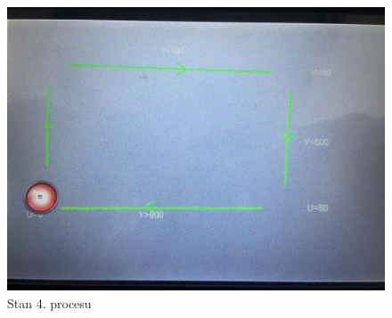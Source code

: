 \begin{figure}[H]
    \label{automat_4}
    \centering
    \leftskip-1.1cm
    \includegraphics[scale=0.2]{./sections/inteco/images/automat5.jpg}
    \caption{Stan 4. procesu}
\end{figure}


